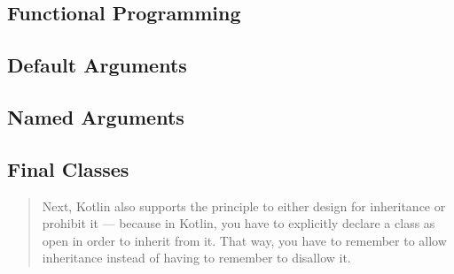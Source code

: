 \documentclass[12pt,a4paper]{report}
\begin{document}
\subsection{Functional Programming}

\subsection{Default Arguments}

\subsection{Named Arguments}

\subsection{Final Classes}

\begin{quotation}
Next, Kotlin also supports the principle to either design for inheritance or prohibit it — because in Kotlin, you have to explicitly declare a class as open in order to inherit from it. That way, you have to remember to allow inheritance instead of having to remember to disallow it.\cite{kotlin-sommerhoff}
\end{quotation}
\end{document}
